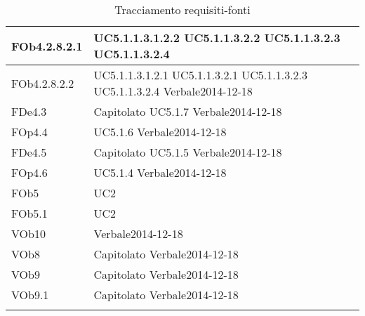 \begin{longtable}{|l|p{4cm}|}
\hline
FOb4.2.8.2.1 & UC5.1.1.3.1.2.2 \linebreak  UC5.1.1.3.2.2 \linebreak  UC5.1.1.3.2.3 \linebreak  UC5.1.1.3.2.4 \linebreak  \\ 
\hline
FOb4.2.8.2.2 & UC5.1.1.3.1.2.1 \linebreak  UC5.1.1.3.2.1 \linebreak  UC5.1.1.3.2.3 \linebreak  UC5.1.1.3.2.4 \linebreak  Verbale2014-12-18 \linebreak  \\ 
\hline
FDe4.3 & Capitolato \linebreak  UC5.1.7 \linebreak  Verbale2014-12-18 \linebreak  \\ 
\hline
FOp4.4 & UC5.1.6 \linebreak  Verbale2014-12-18 \linebreak  \\ 
\hline
FDe4.5 & Capitolato \linebreak  UC5.1.5 \linebreak  Verbale2014-12-18 \linebreak  \\ 
\hline
FOp4.6 & UC5.1.4 \linebreak  Verbale2014-12-18 \linebreak  \\ 
\hline
FOb5 & UC2 \linebreak \\ 
\hline
FOb5.1 & UC2 \linebreak  \\ 
\hline
VOb10 & Verbale2014-12-18 \linebreak \\ 
\hline
VOb8 & Capitolato \linebreak Verbale2014-12-18 \linebreak \\ 
\hline
VOb9 & Capitolato \linebreak Verbale2014-12-18 \linebreak \\ 
\hline
VOb9.1 & Capitolato \linebreak  Verbale2014-12-18 \linebreak  \\ 
\hline
\caption{Tracciamento requisiti-fonti}
\end{longtable}
\newpage
